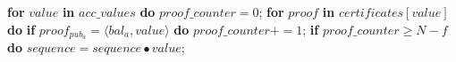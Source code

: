 \begin{algorithm}
\begin{algorithmic}[1]
		\State \hspace{\algorithmicindent}\hspace{\algorithmicindent}\hspace{\algorithmicindent} 
		\textbf{for} $value$ \textbf{in} $acc\_values$ \textbf{do}
		\State 
		\hspace{\algorithmicindent}\hspace{\algorithmicindent}\hspace{\algorithmicindent}\hspace{\algorithmicindent} $proof\_counter = 0$;
		\State 
		\hspace{\algorithmicindent}\hspace{\algorithmicindent}\hspace{\algorithmicindent}\hspace{\algorithmicindent} 
		\textbf{for} $proof$ \textbf{in} $certificates[value]$ \textbf{do}
		\State \hspace{\algorithmicindent}\hspace{\algorithmicindent}\hspace{\algorithmicindent}\hspace{\algorithmicindent}\hspace{\algorithmicindent} \textbf{if} $proof_{pub_a} = \langle bal_a, value \rangle$ \textbf{do}
		\State \hspace{\algorithmicindent}\hspace{\algorithmicindent}\hspace{\algorithmicindent}\hspace{\algorithmicindent}\hspace{\algorithmicindent}\hspace{\algorithmicindent} $proof\_counter \mathrel{+{=}} 1$;
		\State
		\State \hspace{\algorithmicindent}\hspace{\algorithmicindent}\hspace{\algorithmicindent}\hspace{\algorithmicindent}\hspace{\algorithmicindent} \textbf{if} $proof\_counter \geq N-f$ \textbf{do}
		\State \hspace{\algorithmicindent}\hspace{\algorithmicindent}\hspace{\algorithmicindent}\hspace{\algorithmicindent}\hspace{\algorithmicindent}\hspace{\algorithmicindent} $sequence = sequence \bullet value$;

\end{algorithmic}
\end{algorithm}
